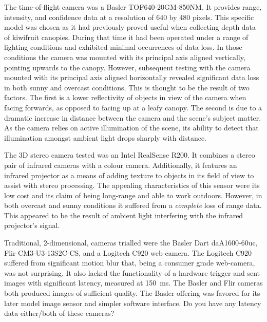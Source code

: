 \documentclass[preprint,authoryear,12pt]{elsarticle}
\begin{document}
        The time-of-flight camera was a Basler TOF640-20GM-850NM.
        It provides range, intensity, and confidence data at a resolution of 640 by 480 pixels.
        This specific model was chosen as it had previously proved useful when collecting depth data of kiwifruit canopies.
        During that time it had been operated under a range of lighting conditions and exhibited minimal occurrences of data loss.
        In those conditions the camera was mounted with its principal axis aligned vertically, pointing upwards to the canopy.
        However, subsequent testing with the camera mounted with its principal axis aligned horizontally revealed significant data loss in both sunny and overcast conditions.
        This is thought to be the result of two factors.
        The first is a lower reflectivity of objects in view of the camera when facing forwards, as opposed to facing up at a leafy canopy.
        The second is due to a dramatic increase in distance between the camera and the scene's subject matter.
        As the camera relies on active illumination of the scene, its ability to detect that illumination amongst ambient light drops sharply with distance.

        The 3D stereo camera tested was an Intel RealSense R200.
        It combines a stereo pair of infrared cameras with a colour camera.
        Additionally, it features an infrared projector as a means of adding texture to objects in its field of view to assist with stereo processing.
        The appealing characteristics of this sensor were its low cost and its claim of being long-range and able to work outdoors.
        However, in both overcast and sunny conditions it suffered from a \emph{complete} loss of range data.
        This appeared to be the result of ambient light interfering with the infrared projector’s signal.

        Traditional, 2-dimensional, cameras trialled were the Basler Dart daA1600-60uc, Flir CM3-U3-13S2C-CS, and a Logitech C920 web-camera.
        The Logitech C920 suffered from significant motion blur that, being a consumer grade web-camera, was not surprising.
        It also lacked the functionality of a hardware trigger and sent images with significant latency, measured at \SI{150}{\milli\second}.
        The Basler and Flir cameras both produced images of sufficient quality.
        The Basler offering was favored for its later model image sensor and simpler software interface.
        \color{red}Do you have any latency data either/both of these cameras\color{black}?
\end{document}
